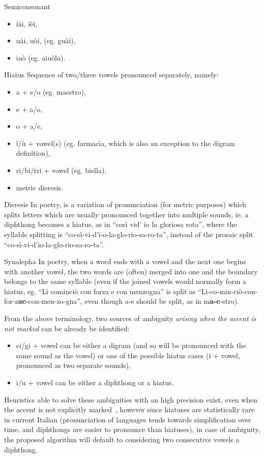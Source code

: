 \begin{labeling}{Semiconsonant}
	\begin{itemize}
		\item iài, ièi,
		\item uài, uòi, (eg. guài),
		\item iuò (eg. aiuòla).
	\end{itemize}
	\item [Hiatus] Sequence of two/three vowels pronounced separately, namely:
	\begin{itemize}
		\item a + e/o (eg. maestro),
		\item e + a/o,
		\item o + a/e,
		\item ì/ù + vowel(s) (eg. farmacìa, which is also an exception to the digram definition),
		\item ri/bi/tri + vowel (eg. biella),
		\item metric dieresis.
	\end{itemize}
	\item [Dieresis] In poetry, is a variation of pronunciation (for metric purposes) which splits letters which are usually pronounced together into multiple sounds, ie. a diphthong becomes a hiatus, as in ``così vid’ ïo la gloriosa rota'', where the syllable splitting is ``co-sì-vi-d’ï-o-la-glo-rio-sa-ro-ta'', instead of the prosaic split ``co-sì-vi-d’io-la-glo-rio-sa-ro-ta''.
	\item [Synalepha] In poetry, when a word ends with a vowel and the next one begins with another vowel, the two words are (often) merged into one and the boundary belongs to the same syllable (even if the joined vowels would normally form a hiatus, eg. ``Lì cominciò con forza e con menzogna'' is split as ``Lì-co-min-ciò-con-for-z\textbf{ae}-con-men-zo-gna'', even though a-e should be split, as in m\textbf{a-e}-stro).
\end{labeling}

From the above terminology, two sources of ambiguity \emph{arising when the accent is not marked} can be already be identified:
\begin{itemize}
	\item ci/gi + vowel can be either a digram (and so will be pronounced with the same sound as the vowel) or one of the possible hiatus cases (i + vowel, pronounced as two separate sounds),
	\item i/u + vowel can be either a diphthong or a hiatus.
\end{itemize}
Heuristics able to solve these ambiguities with an high precision exist, even when the accent is not explicitly marked~\cite{iato}, however since hiatuses are statistically rare in current Italian (pronunciation of languages tends towards simplification over time, and diphthongs are easier to pronounce than hiatuses), in case of ambiguity, the proposed algorithm will default to considering two consecutive vowels a diphthong.

